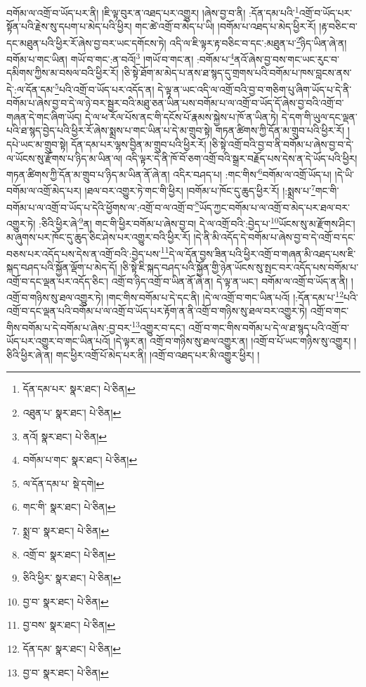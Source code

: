 བགོམ་ལ་འགྲོ་བ་ཡོད་པར་ནི། །ཇི་ལྟ་བུར་ན་འཐད་པར་འགྱུར། །ཞེས་བྱ་བ་ནི། :དོན་དམ་པའི་\footnote{དོན་དམ་པར་  སྣར་ཐང་།  པེ་ཅིན། }འགྲོ་བ་ཡོད་པར་སྟོན་པའི་རྗེས་སུ་དཔག་པ་མེད་པའི་ཕྱིར། གང་ཚེ་འགྲོ་བ་མེད་པ་ཡི། །བགོམ་པ་འཐད་པ་མེད་ཕྱིར་རོ། །རྟ་བཅིང་བ་དང་མཐུན་པའི་ཕྱིར་རོ་ཞེས་བྱ་བར་ཡང་དགོངས་ཏེ། འདི་ལ་ཇི་ལྟར་རྟ་བཅིང་བ་དང་:མཐུན་པ་\footnote{འཐུན་པ་  སྣར་ཐང་།  པེ་ཅིན། }ཉིད་ཡིན་ཞེ་ན། བགོམ་པ་གང་ཡིན། གཡོ་བ་གང་:ན་བའོ།\footnote{ནའོ།  སྣར་ཐང་།  པེ་ཅིན། } །གཡོ་བ་གང་ན། :བགོམ་པ་\footnote{བགོམ་པ་གང་  སྣར་ཐང་།  པེ་ཅིན། }ནའོ་ཞེས་བྱ་བས་གང་ཡང་རུང་བ་དམིགས་ཀྱིས་མ་བསལ་བའི་ཕྱིར་རོ། །ཅི་སྟེ་ཐོག་མ་མེད་པ་ནས་ཐ་སྙད་དུ་གྲགས་པའི་བགོམ་པ་ཁས་བླངས་ནས་དེ་:ལ་དོན་དམ་\footnote{ལ་དོན་དམ་པ་  སྡེ་དགེ། }པའི་འགྲོ་བ་ཡོད་པར་འདོད་ན། དེ་ལྟ་ན་ཡང་འདི་ལ་འགྲོ་བའི་བྱ་བ་གཅིག་པུ་ཞིག་ཡོད་པ་དེ་ནི་བགོམ་པ་ཞེས་བྱ་བ་དེ་ལ་ཉེ་བར་སྦྱར་བའི་མཐུ་ཅན་ཡིན་པས་བགོམ་པ་ལ་འགྲོ་བ་ཡོད་དོ་ཞེས་བྱ་བའི་འགྲོ་བ་གཞན་དེ་གང་ཞིག་ཡོད། དེ་ལ་ཕ་རོལ་པོས་ནང་གི་དངོས་པོ་རྣམས་སྐྱེས་པ་ཁོ་ན་ཡིན་ཏེ། དེ་དག་གི་ཡུལ་དང་ལྡན་པའི་ཐ་སྙད་བྱེད་པའི་ཕྱིར་རོ་ཞེས་སྨྲས་པ་གང་ཡིན་པ་དེ་མ་གྲུབ་སྟེ། གཏན་ཚིགས་ཀྱི་དོན་མ་གྲུབ་པའི་ཕྱིར་རོ། །དཔེ་ཡང་མ་གྲུབ་སྟེ། དོན་དམ་པར་ལྷས་བྱིན་མ་གྲུབ་པའི་ཕྱིར་རོ། །ཅི་སྟེ་འགྲོ་བའི་བྱ་བ་ནི་བགོམ་པ་ཞེས་བྱ་བ་དེ་ལ་ཡོངས་སུ་རྫོགས་པ་ཉིད་མ་ཡིན་ལ། འདི་ལྟར་དེ་ནི་ཁོ་བོ་ཅག་འགྲོ་བའི་སྒྲར་བརྗོད་པས་དེས་ན་དེ་ཡོད་པའི་ཕྱིར། གཏན་ཚིགས་ཀྱི་དོན་མ་གྲུབ་པ་ཉིད་མ་ཡིན་ནོ་ཞེ་ན། འདིར་བཤད་པ། :གང་གིས་\footnote{གང་གི་  སྣར་ཐང་།  པེ་ཅིན། }བགོམ་ལ་འགྲོ་ཡོད་པ། །དེ་ཡི་བགོམ་ལ་འགྲོ་མེད་པར། །ཐལ་བར་འགྱུར་ཏེ་གང་གི་ཕྱིར། །བགོམ་པ་ཁོང་དུ་ཆུད་ཕྱིར་རོ། །:སྨྲས་པ་\footnote{སྨྲ་བ་  སྣར་ཐང་།  པེ་ཅིན། }གང་གི་བགོམ་པ་ལ་འགྲོ་བ་ཡོད་པ་དེའི་ཕྱོགས་ལ་:འགྲོ་བ་ལ་འགྲོ་བ་\footnote{འགྲོ་བ་  སྣར་ཐང་།  པེ་ཅིན། }ཡོད་ཀྱང་བགོམ་པ་ལ་འགྲོ་བ་མེད་པར་ཐལ་བར་འགྱུར་ཏེ། :ཅིའི་ཕྱིར་ཞེ་\footnote{ཅིའི་ཕྱིར་  སྣར་ཐང་།  པེ་ཅིན། }ན། གང་གི་ཕྱིར་བགོམ་པ་ཞེས་བྱ་བ། དེ་ལ་འགྲོ་བའི་:བྱེད་པ་\footnote{བྱ་བ་  སྣར་ཐང་།  པེ་ཅིན། }ཡོངས་སུ་མ་རྫོགས་ཤིང་། མ་ཞུགས་པར་ཁོང་དུ་ཆུད་ཅིང་ཤེས་པར་འགྱུར་བའི་ཕྱིར་རོ། །དེ་ནི་མི་འདོད་དེ་བགོམ་པ་ཞེས་བྱ་བ་དེ་འགྲོ་བ་དང་བཅས་པར་འདོད་པས་དེས་ན་འགྲོ་བའི་:བྱེད་པས་\footnote{བྱ་བས་  སྣར་ཐང་།  པེ་ཅིན། }དེ་ལ་དོན་བྱས་ཟིན་པའི་ཕྱིར་འགྲོ་བ་གཞན་མི་འཐད་པས་ཇི་སྐད་བཤད་པའི་སྐྱོན་ལྡོག་པ་མེད་དོ། །ཅི་སྟེ་ཇི་སྐད་བཤད་པའི་སྐྱོན་གྱི་ཉེན་ཡོངས་སུ་སྤང་བར་འདོད་པས་བགོམ་པ་འགྲོ་བ་དང་ལྡན་པར་འདོད་ཅིང་། འགྲོ་བ་ཉིད་འགྲོ་བ་ཡིན་ནོ་ཞེ་ན། དེ་ལྟ་ན་ཡང་། བགོམ་ལ་འགྲོ་བ་ཡོད་ན་ནི། །འགྲོ་བ་གཉིས་སུ་ཐལ་འགྱུར་ཏེ། །གང་གིས་བགོམ་པ་དེ་དང་ནི། །དེ་ལ་འགྲོ་བ་གང་ཡིན་པའོ། །:དོན་དམ་པ་\footnote{དོན་དམ་  སྣར་ཐང་།  པེ་ཅིན། }པའི་འགྲོ་བ་དང་ལྡན་པའི་བགོམ་པ་ལ་འགྲོ་བ་ཡོད་པར་རྟོག་ན་ནི་འགྲོ་བ་གཉིས་སུ་ཐལ་བར་འགྱུར་ཏེ། འགྲོ་བ་གང་གིས་བགོམ་པ་དེ་བགོམ་པ་ཞེས་:བྱ་བར་\footnote{བྱ་བ་  སྣར་ཐང་།  པེ་ཅིན། }འགྱུར་བ་དང་། འགྲོ་བ་གང་གིས་བགོམ་པ་དེ་ལ་ཐ་སྙད་པའི་འགྲོ་བ་ཡོད་པར་འགྱུར་བ་གང་ཡིན་པའོ། །དེ་ལྟར་ན། འགྲོ་བ་གཉིས་སུ་ཐལ་འགྱུར་ན། །འགྲོ་བ་པོ་ཡང་གཉིས་སུ་འགྱུར། །ཅིའི་ཕྱིར་ཞེ་ན། གང་ཕྱིར་འགྲོ་པོ་མེད་པར་ནི། །འགྲོ་བ་འཐད་པར་མི་འགྱུར་ཕྱིར། །
